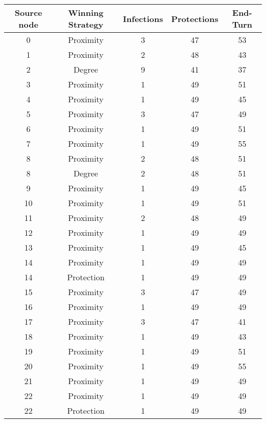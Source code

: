 \documentclass[results.tex]{subfiles}
\begin{document}
\begin{center}
  \begin{tabular}{| c || c | c | c | c |}
    \hline
    {\bfseries Source node} & {\bfseries Winning Strategy} & {\bfseries Infections} & {\bfseries Protections} & {\bfseries End-Turn} \\  %
    \hline\hline
    0 & Proximity & 3 & 47 & 53 \\ 
    \hline
    1 & Proximity & 2 & 48 & 43 \\ 
    \hline
    2 & Degree & 9 & 41 & 37 \\ 
    \hline
    3 & Proximity & 1 & 49 & 51 \\ 
    \hline
    4 & Proximity & 1 & 49 & 45 \\ 
    \hline
    5 & Proximity & 3 & 47 & 49 \\ 
    \hline
    6 & Proximity & 1 & 49 & 51 \\ 
    \hline
    7 & Proximity & 1 & 49 & 55 \\ 
    \hline
    8 & Proximity & 2 & 48 & 51 \\ 
    \hline
    8 & Degree & 2 & 48 & 51 \\ 
    \hline
    9 & Proximity & 1 & 49 & 45 \\ 
    \hline
    10 & Proximity & 1 & 49 & 51 \\ 
    \hline
    11 & Proximity & 2 & 48 & 49 \\ 
    \hline
    12 & Proximity & 1 & 49 & 49 \\ 
    \hline
    13 & Proximity & 1 & 49 & 45 \\ 
    \hline
    14 & Proximity & 1 & 49 & 49 \\ 
    \hline
    14 & Protection & 1 & 49 & 49 \\ 
    \hline
    15 & Proximity & 3 & 47 & 49 \\ 
    \hline
    16 & Proximity & 1 & 49 & 49 \\ 
    \hline
    17 & Proximity & 3 & 47 & 41 \\ 
    \hline
    18 & Proximity & 1 & 49 & 43 \\ 
    \hline
    19 & Proximity & 1 & 49 & 51 \\ 
    \hline
    20 & Proximity & 1 & 49 & 55 \\ 
    \hline
    21 & Proximity & 1 & 49 & 49 \\ 
    \hline
    22 & Proximity & 1 & 49 & 49 \\ 
    \hline
    22 & Protection & 1 & 49 & 49 \\ 

\end{tabular}
\end{center}
\end{document}
